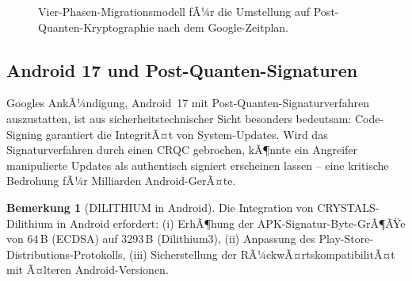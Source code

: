 ﻿\documentclass[a4paper,12pt]{article}
\theoremstyle{definition}
\newtheorem{bemerkung}{Bemerkung}[section]
\begin{document}
\begin{figure}[H]
\centering
{}
\caption{Vier-Phasen-Migrationsmodell fÃ¼r die Umstellung auf Post-Quanten-Kryptographie nach dem Google-Zeitplan.}
\label{fig:migration}
\end{figure}

\subsection{Android 17 und Post-Quanten-Signaturen}

Googles AnkÃ¼ndigung, Android~17 mit Post-Quanten-Signaturverfahren auszustatten,
ist aus sicherheitstechnischer Sicht besonders bedeutsam: Code-Signing garantiert
die IntegritÃ¤t von System-Updates. Wird das Signaturverfahren durch einen CRQC
gebrochen, kÃ¶nnte ein Angreifer manipulierte Updates als authentisch signiert
erscheinen lassen -- eine kritische Bedrohung fÃ¼r Milliarden Android-GerÃ¤te.

\begin{bemerkung}[DILITHIUM in Android]
Die Integration von CRYSTALS-Dilithium in Android erfordert:
(i) ErhÃ¶hung der APK-Signatur-Byte-GrÃ¶ÃŸe von 64\,B (ECDSA) auf 3293\,B (Dilithium3),
(ii) Anpassung des Play-Store-Distributions-Protokolls,
(iii) Sicherstellung der RÃ¼ckwÃ¤rtskompatibilitÃ¤t mit Ã¤lteren Android-Versionen.
\end{bemerkung}
\end{document}
